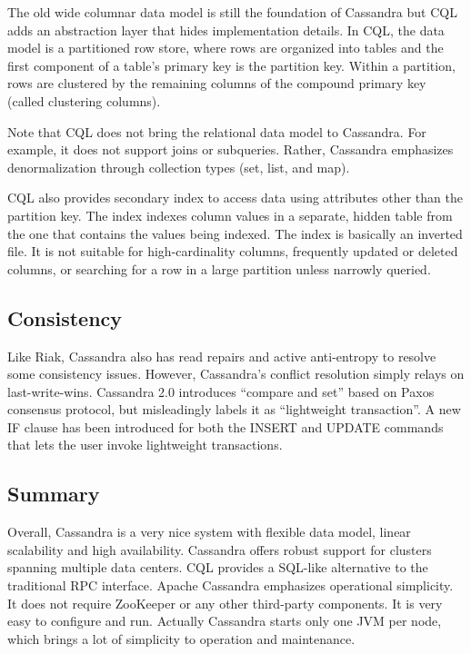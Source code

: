 \documentclass[11pt]{book}
\begin{document}
The old wide columnar data model is still the foundation of Cassandra but CQL adds an abstraction layer that hides implementation details. In CQL, the data model is a partitioned row store, where rows are organized into tables and the first component of a table's primary key is the partition key. Within a partition, rows are clustered by the remaining columns of the compound primary key (called clustering columns).

Note that CQL does not bring the relational data model to Cassandra. For example, it does not support joins or subqueries. Rather, Cassandra emphasizes denormalization through collection types (set, list, and map).

CQL also provides secondary index to access data using attributes other than the partition key. The index indexes column values in a separate, hidden table from the one that contains the values being indexed. The index is basically an inverted file. It is not suitable for high-cardinality columns, frequently updated or deleted columns, or searching for a row in a large partition unless narrowly queried.

\subsection{Consistency}

Like Riak, Cassandra also has read repairs and active anti-entropy to resolve some consistency issues. However, Cassandra's conflict resolution simply relays on last-write-wins. Cassandra 2.0 introduces ``compare and set'' based on Paxos consensus protocol, but misleadingly labels it as ``lightweight transaction''. A new IF clause has been introduced for both the INSERT and UPDATE commands that lets the user invoke lightweight transactions.

\subsection{Summary}
Overall, Cassandra is a very nice system with flexible data model, linear scalability and high availability. 
Cassandra offers robust support for clusters spanning multiple data centers. CQL provides a SQL-like alternative to the traditional RPC interface.
Apache Cassandra emphasizes operational simplicity. It does not require ZooKeeper or any other third-party components. It is very easy to configure and run. Actually Cassandra starts only one JVM per node, which brings a lot of simplicity to operation and maintenance.
\end{document}
